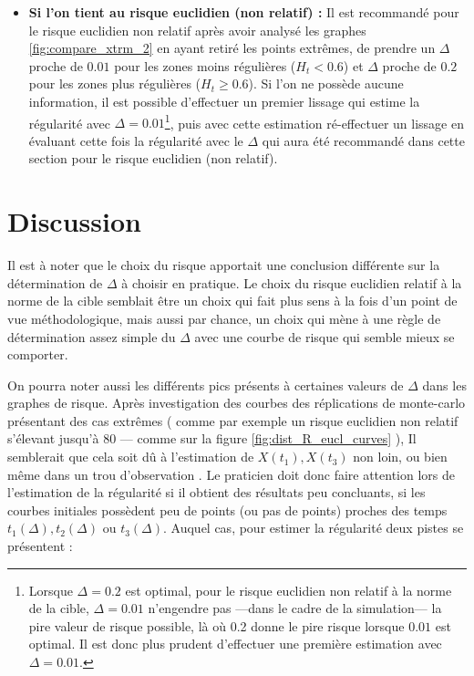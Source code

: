 \begin{itemize}
\bigskip

\item \textbf{Si l'on tient au risque euclidien (non relatif) : } Il est recommandé pour le risque euclidien non relatif après avoir analysé les graphes \ref{fig:compare_xtrm_2} en ayant retiré les points extrêmes, de prendre un $\Delta$ proche de $0.01$ pour les zones moins régulières ($H_t < 0.6$) et $\Delta$ proche de $0.2$ pour les zones plus régulières ($H_t \geq 0.6$). Si l'on ne possède aucune information, il est possible d'effectuer un premier lissage qui estime la régularité avec $\Delta = 0.01$\footnote{Lorsque $\Delta = 0.2$ est optimal, pour le risque euclidien non relatif à la norme de la cible, $\Delta = 0.01$ n'engendre pas —dans le cadre de la simulation— la pire valeur de risque possible, là où 0.2 donne le pire risque lorsque $0.01$ est optimal. Il est donc plus prudent d'effectuer une première estimation avec $\Delta = 0.01$.}, puis avec cette estimation ré-effectuer un lissage en évaluant cette fois la régularité avec le $\Delta$ qui aura été recommandé dans cette section pour le risque euclidien (non relatif).
\end{itemize}

\section{Discussion}

Il est à noter que le choix du risque apportait une conclusion différente sur la détermination de $\Delta$ à choisir en pratique. Le choix du risque euclidien relatif à la norme de la cible semblait être un choix qui fait plus sens à la fois d'un point de vue méthodologique, mais aussi par chance, un choix qui mène à une règle de détermination assez simple du $\Delta$ avec une courbe de risque qui semble mieux se comporter. 

\bigskip

On pourra noter aussi les différents pics présents à certaines valeurs de $\Delta$ dans les graphes de risque. Après investigation des courbes des réplications de monte-carlo présentant des cas extrêmes ( comme par exemple un risque euclidien non relatif s'élevant jusqu'à 80 — comme sur la figure \ref{fig:dist_R_eucl_curves} ), Il semblerait que cela soit dû à l'estimation de $X(t_1), X(t_3)$ non loin, ou bien même dans un \og trou d'observation \fg. Le praticien doit donc faire attention lors de l'estimation de la régularité si il obtient des résultats peu concluants, si les courbes initiales possèdent peu de points (ou pas de points) proches des temps $t_1(\Delta), t_2(\Delta)$ ou $t_3(\Delta)$. Auquel cas, pour estimer la régularité deux pistes se présentent :

